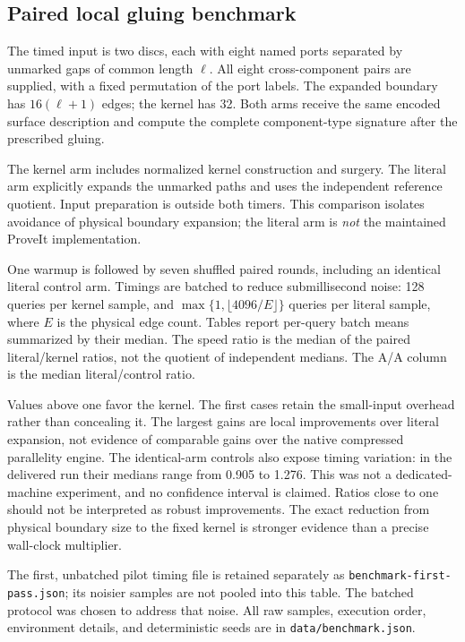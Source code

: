 \documentclass[11pt]{article}
\theoremstyle{definition}
\theoremstyle{remark}\newtheorem{remark}[theorem]{Remark}
\newcommand{\code}[1]{\texttt{#1}}
\begin{document}
\subsection{Paired local gluing benchmark}
The timed input is two discs, each with eight named ports separated by unmarked gaps of common length $\ell$. All eight cross-component pairs are supplied, with a fixed permutation of the port labels. The expanded boundary has $16(\ell+1)$ edges; the kernel has 32. Both arms receive the same encoded surface description and compute the complete component-type signature after the prescribed gluing.

The kernel arm includes normalized kernel construction and surgery. The literal arm explicitly expands the unmarked paths and uses the independent reference quotient. Input preparation is outside both timers. This comparison isolates avoidance of physical boundary expansion; the literal arm is \emph{not} the maintained ProveIt implementation.

One warmup is followed by seven shuffled paired rounds, including an identical literal control arm. Timings are batched to reduce submillisecond noise: 128 queries per kernel sample, and $\max\{1,\lfloor4096/E\rfloor\}$ queries per literal sample, where $E$ is the physical edge count. Tables report per-query batch means summarized by their median. The speed ratio is the median of the paired literal/kernel ratios, not the quotient of independent medians. The A/A column is the median literal/control ratio.



Values above one favor the kernel. The first cases retain the small-input overhead rather than concealing it. The largest gains are local improvements over literal expansion, not evidence of comparable gains over the native compressed parallelity engine. The identical-arm controls also expose timing variation: in the delivered run their medians range from 0.905 to 1.276. This was not a dedicated-machine experiment, and no confidence interval is claimed. Ratios close to one should not be interpreted as robust improvements. The exact reduction from physical boundary size to the fixed kernel is stronger evidence than a precise wall-clock multiplier.

The first, unbatched pilot timing file is retained separately as \code{benchmark-first-pass.json}; its noisier samples are not pooled into this table. The batched protocol was chosen to address that noise. All raw samples, execution order, environment details, and deterministic seeds are in \code{data/benchmark.json}.
\end{document}
